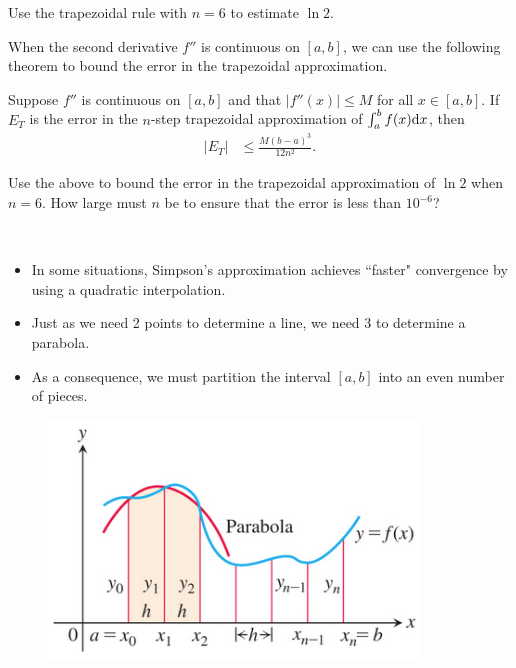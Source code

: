 \newpage

\begin{example}
Use the trapezoidal rule with $n=6$ to estimate $\ln 2$.
\end{example}

\newpage

\begin{remark}
When the second derivative $f''$ is continuous on $[a,b]$, we can use the following theorem to bound the error in the trapezoidal approximation.
\end{remark}

\begin{theorem}
Suppose $f''$ is continuous on $[a,b]$ and that $|f''(x)|\le M$ for all $x\in [a,b]$.
If $E_T$ is the error in the $n$-step  trapezoidal approximation of $\int_a^bf(x)\mathrm{d} x$, then
\begin{align*}
|E_T| &\le \frac{M(b-a)^3}{12n^2}.
\end{align*}
\end{theorem}

\begin{example}
Use the above to bound the error in the trapezoidal approximation of $\ln 2$ when $n=6$.
How large must $n$ be to ensure that the error is less than $10^{-6}$?
\end{example}

\newpage

\begin{remark}\,
\begin{itemize}
\item In some situations, Simpson's approximation achieves ``faster" convergence by using a quadratic interpolation.
\item Just as we need 2 points to determine a line, we need 3 to determine a parabola.
\item As a consequence, we must partition the interval $[a,b]$ into an even number of pieces.
\end{itemize}
\end{remark}

\begin{figure}[H]
\includegraphics[height=2.5in]{img/simpson_rule}
\end{figure}

